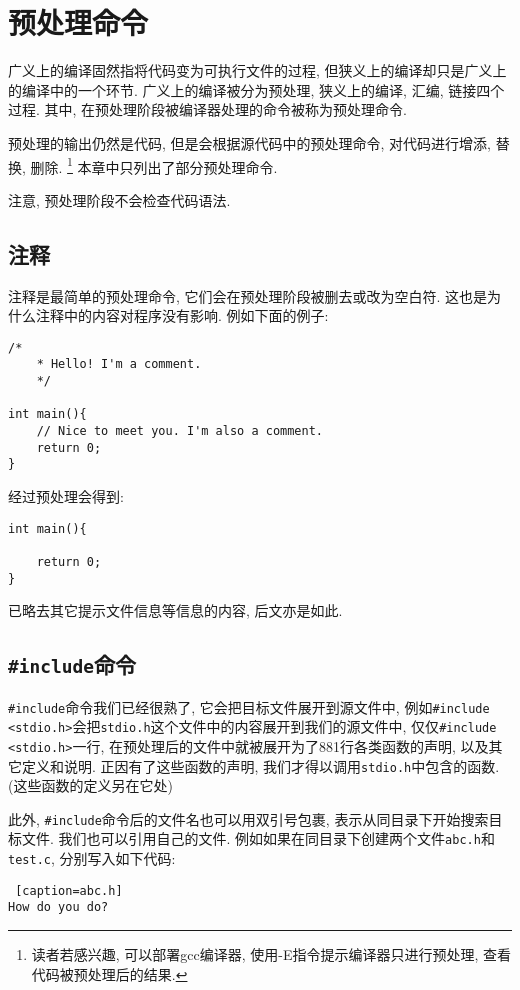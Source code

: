 \chapter{预处理命令} \label{预处理命令}
    广义上的编译固然指将代码变为可执行文件的过程, 但狭义上的编译却只是广义上的编译中的一个环节. 广义上的编译被分为预处理, 狭义上的编译, 汇编, 链接四个过程. 其中, 在预处理阶段被编译器处理的命令被称为预处理命令.

    预处理的输出仍然是代码, 但是会根据源代码中的预处理命令, 对代码进行增添, 替换, 删除. \footnote{读者若感兴趣, 可以部署gcc编译器, 使用-E指令提示编译器只进行预处理, 查看代码被预处理后的结果.} 本章中只列出了部分预处理命令.

    注意, 预处理阶段不会检查代码语法.

    \section{注释}
        注释是最简单的预处理命令, 它们会在预处理阶段被删去或改为空白符. 这也是为什么注释中的内容对程序没有影响. 例如下面的例子:
\begin{lstlisting}
/*
    * Hello! I'm a comment.
    */

int main(){
    // Nice to meet you. I'm also a comment.
    return 0;
}
\end{lstlisting}
        经过预处理会得到:
\begin{lstlisting}
int main(){

    return 0;
}
\end{lstlisting}
        
        已略去其它提示文件信息等信息的内容, 后文亦是如此.

    \section{\texttt{\#include}命令}
        \texttt{\#include}命令我们已经很熟了, 它会把目标文件展开到源文件中, 例如\texttt{\#include <stdio.h>}会把\texttt{stdio.h}这个文件中的内容展开到我们的源文件中, 仅仅\texttt{\#include <stdio.h>}一行, 在预处理后的文件中就被展开为了881行各类函数的声明, 以及其它定义和说明. 正因有了这些函数的声明, 我们才得以调用\texttt{stdio.h}中包含的函数. (这些函数的定义另在它处)

        此外, \texttt{\#include}命令后的文件名也可以用双引号包裹, 表示从同目录下开始搜索目标文件. 我们也可以引用自己的文件. 例如如果在同目录下创建两个文件\texttt{abc.h}和\texttt{test.c}, 分别写入如下代码:
\begin{lstlisting} [caption=abc.h]
How do you do?
\end{lstlisting}

